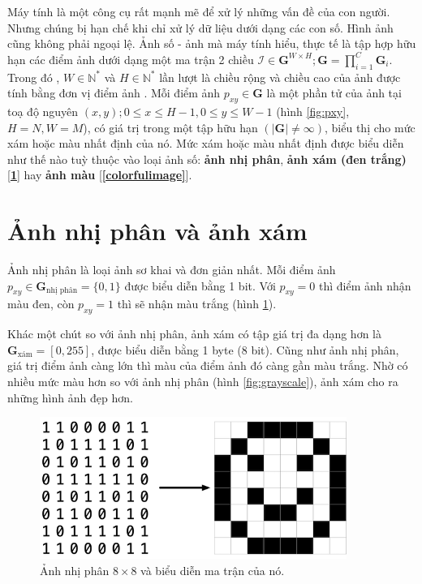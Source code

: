 \documentclass[a4paper, 12pt]{report}
\begin{document}
Máy tính là một công cụ rất mạnh mẽ để xử lý những vấn đề của con người.
Nhưng chúng bị hạn chế khi chỉ xử lý dữ liệu dưới dạng các con số.
Hình ảnh cũng không phải ngoại lệ.
Ảnh số - ảnh mà máy tính hiểu, thực tế là tập hợp hữu hạn các điểm ảnh dưới dạng một ma trận 2 chiều $\mathcal{I} \in \bm{G}^{W\times H}; \bm{G} = \prod_{i=1}^{C}\bm{G}_i$.
Trong đó , $W \in \mathbb{N}^*$ và $H \in \mathbb{N}^*$ lần lượt là chiều rộng và chiều cao của ảnh được tính bằng đơn vị điểm ảnh \cite{introtocvnttuan}.
Mỗi điểm ảnh $p_{xy} \in \bm{G}$ là một phần tử của ảnh tại toạ độ nguyên $(x, y); 0 \le x \le H - 1, 0 \le y \le  W - 1$ (hình \ref{fig:pxy}, $H=N, W=M$), có giá trị trong một tập hữu hạn $\left(\left|\bm{G}\right| \neq \infty\right)$, biểu thị cho mức xám hoặc màu nhất định của nó.
Mức xám hoặc màu nhất định được biểu diễn như thế nào tuỳ thuộc vào loại ảnh số: \textbf{ảnh nhị phân}, \textbf{ảnh xám (đen trắng)} [\textbf{\ref{grayimage}}] hay \textbf{ảnh màu} [\textbf{\ref{colorfulimage}}].

\section{Ảnh nhị phân và ảnh xám}\label{grayimage}

Ảnh nhị phân \cite{wikibinimg2021} là loại ảnh sơ khai và đơn giản nhất.
Mỗi điểm ảnh $p_{xy} \in \bm{G}_{\text{nhị phân}} = \{0, 1\}$ được biểu diễn bằng 1 bit.
Với $p_{xy} = 0$ thì điểm ảnh nhận màu đen, còn $p_{xy} = 1$ thì sẽ nhận màu trắng (hình \ref{fig:binimg}).\vspace{5pt}

Khác một chút so với ảnh nhị phân, ảnh xám \cite{wikigrayimg2021} có tập giá trị đa dạng hơn là $\bm{G}_{\text{xám}} = [0, 255]$, được biểu diễn bằng 1 byte (8 bit).
Cũng như ảnh nhị phân, giá trị điểm ảnh càng lớn thì màu của điểm ảnh đó càng gần màu trắng.
Nhờ có nhiều mức màu hơn so với ảnh nhị phân (hình \ref{fig:grayscale}), ảnh xám cho ra những hình ảnh đẹp hơn.

\begin{figure}[!h]
\captionsetup{width=0.8\textwidth}
\centering
\includegraphics[width=10cm]{images/binimg.png}
\caption{Ảnh nhị phân $8\times 8$ và biểu diễn ma trận của nó.}
\label{fig:binimg}
\end{figure}
\end{document}
